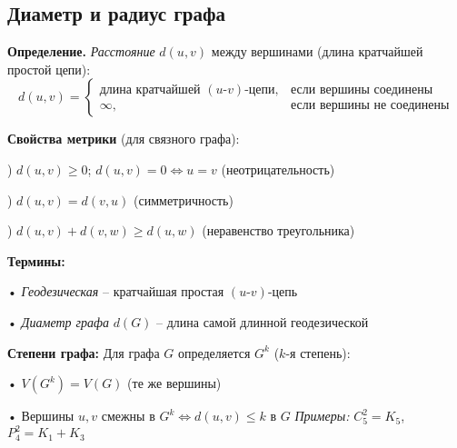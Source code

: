 \subsection{Диаметр и радиус графа}

\noindent\textbf{Определение.} \textit{Расстояние} $d(u,v)$ между вершинами (длина кратчайшей простой цепи):
\[ d(u,v) = \begin{cases} 
\text{длина кратчайшей }(u\text{-}v)\text{-цепи}, & \text{если вершины соединены} \\
\infty, & \text{если вершины не соединены}
\end{cases} \]

\noindent\textbf{Свойства метрики} (для связного графа):

) $d(u,v) \geq 0$; $d(u,v) = 0 \Leftrightarrow u = v$ (неотрицательность)

) $d(u,v) = d(v,u)$ (симметричность)

) $d(u,v) + d(v,w) \geq d(u,w)$ (неравенство треугольника)

\noindent\textbf{Термины:}

\noindent • \textit{Геодезическая} -- кратчайшая простая $(u\text{-}v)$-цепь

\noindent • \textit{Диаметр графа} $d(G)$ -- длина самой длинной геодезической

\noindent\textbf{Степени графа:} 
\noindent Для графа $G$ определяется $G^k$ ($k$-я степень):

\noindent • $V(G^k) = V(G)$ (те же вершины)

\noindent • Вершины $u,v$ смежны в $G^k \Leftrightarrow d(u,v) \leq k$ в $G$
\noindent\textit{Примеры:} $C_5^2 = K_5$, $P_4^2 = K_1 + K_3$